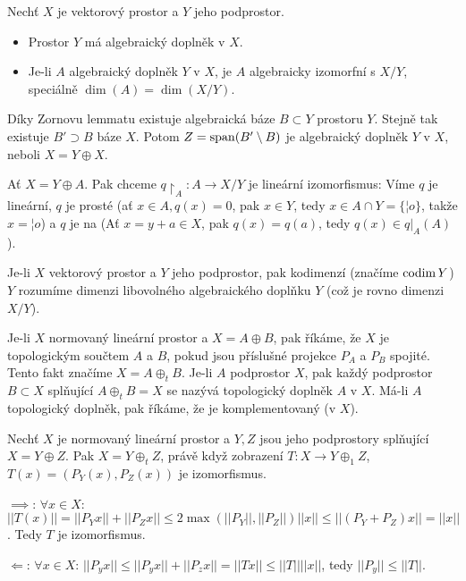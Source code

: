 \documentclass[12pt]{article}					%
\begin{document}
\begin{veta}
	Nechť $X$ je vektorový prostor a $Y$ jeho podprostor.

	\begin{itemize}
		\item Prostor $Y$ má algebraický doplněk v $X$.
		\item Je-li $A$ algebraický doplněk $Y$ v $X$, je $A$ algebraicky izomorfní s $X / Y$, speciálně $\dim(A) = \dim(X / Y)$.
	\end{itemize}

	\begin{dukazin}
		Díky Zornovu lemmatu existuje algebraická báze $B \subset Y$ prostoru $Y$. Stejně tak existuje $B' \supset B$ báze $X$. Potom $Z = \operatorname{span}(B' \setminus B)$ je algebraický doplněk $Y$ v $X$, neboli $X = Y \oplus X$.


		Ať $X = Y \oplus A$. Pak chceme $q\upharpoonright_A: A \rightarrow X / Y$ je lineární izomorfismus: Víme $q$ je lineární, $q$ je prosté (ať $x \in A, q(x) = 0$, pak $x \in Y$, tedy $x \in A \cap Y = \{¦o\}$, takže $x = ¦o$) a $q$ je na (Ať $x = y + a \in X$, pak $q(x) = q(a)$, tedy $q(x) \in q|_A(A)$). 
	\end{dukazin}
\end{veta}

\begin{definice}[Kodimenze]
	Je-li $X$ vektorový prostor a $Y$ jeho podprostor, pak kodimenzí (značíme $\operatorname{codim} Y$) $Y$ rozumíme dimenzi libovolného algebraického doplňku $Y$ (což je rovno dimenzi $X / Y$).
\end{definice}

\begin{definice}
	Je-li $X$ normovaný lineární prostor a $X = A \oplus B$, pak říkáme, že $X$ je topologickým součtem $A$ a $B$, pokud jsou příslušné projekce $P_A$ a $P_B$ spojité. Tento fakt značíme $X = A \oplus_t B$. Je-li $A$ podprostor $X$, pak každý podprostor $B \subset X$ splňující $A \oplus_t B = X$ se nazývá topologický doplněk $A$ v $X$. Má-li $A$ topologický doplněk, pak říkáme, že je komplementovaný (v $X$).
\end{definice}

\begin{veta}
	Nechť $X$ je normovaný lineární prostor a $Y, Z$ jsou jeho podprostory splňující $X = Y \oplus Z$. Pak $X = Y \oplus_t Z$, právě když zobrazení $T: X \rightarrow Y \oplus_1 Z$, $T(x) = (P_Y(x), P_Z(x))$ je izomorfismus.

	\begin{dukazin}
		$\implies$: $\forall x \in X$: $||T(x)|| = ||P_Y x|| + ||P_Z x|| ≤ 2\max (||P_Y||, ||P_Z||) ||x|| ≤ ||(P_Y + P_Z)x|| = ||x||$. Tedy $T$ je izomorfismus.

		$\Leftarrow$: $\forall x \in X$: $||P_yx|| ≤ ||P_yx|| + ||P_z x|| = ||T x|| ≤ ||T|| ||x||$, tedy $||P_y|| ≤ ||T||$.
	\end{dukazin}
\end{veta}
\end{document}

